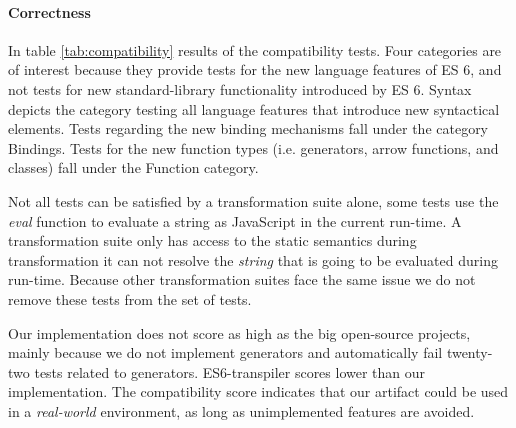 \paragraph{Correctness} \label{sec:correctness}
In table \ref{tab:compatibility} results of the compatibility tests. Four categories are of interest because they provide tests for the new language features of ES 6, and not tests for new standard-library functionality introduced by ES 6. Syntax depicts the category testing all language features that introduce new syntactical elements. Tests regarding the new binding mechanisms fall under the category Bindings. Tests for the new function types (i.e. generators, arrow functions, and classes) fall under the Function category.

Not all tests can be satisfied by a transformation suite alone, some tests use the \textit{eval} function to evaluate a string as JavaScript in the current run-time. A transformation suite only has access to the static semantics during transformation it can not resolve the \textit{string} that is going to be evaluated during run-time. Because other transformation suites face the same issue we do not remove these tests from the set of tests.

Our implementation does not score as high as the big open-source projects, mainly because we do not implement generators and automatically fail twenty-two tests related to generators. ES6-transpiler scores lower than our implementation. The compatibility score indicates that our artifact could be used in a \textit{real-world} environment, as long as unimplemented features are avoided.

